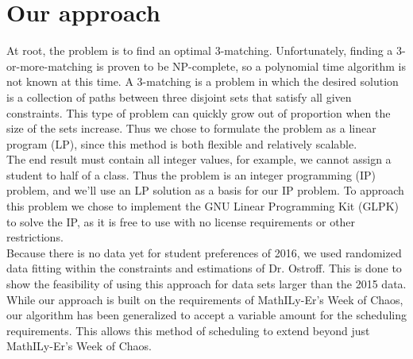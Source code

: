 \documentclass[11pt]{article}
\begin{document}
\section{Our approach}
At root, the problem is to find an optimal 3-matching. Unfortunately, finding a 3-or-more-matching is proven to be NP-complete, so a polynomial time algorithm is not known at this time. A 3-matching is a problem in which the desired solution is a collection of paths between three disjoint sets that satisfy all given constraints. This type of problem can quickly grow out of proportion when the size of the sets increase. Thus we chose to formulate the problem as a linear program (LP), since this method is both flexible and relatively scalable.\\
\indent The end result must contain all integer values, for example, we cannot assign a student to half of a class. Thus the problem is an integer programming (IP) problem, and we'll use an LP solution as a basis for our IP problem. To approach this problem we chose to implement the GNU Linear Programming Kit (GLPK) to solve the IP, as it is free to use with no license requirements or other restrictions.\\
\indent Because there is no data yet for student preferences of 2016, we used randomized data fitting within the constraints and estimations of Dr. Ostroff. This is done to show the feasibility of using this approach for data sets larger than the 2015 data. While our approach is built on the requirements of MathILy-Er's Week of Chaos, our algorithm has been generalized to accept a variable amount for the scheduling requirements. This allows this method of scheduling to extend beyond just MathILy-Er's Week of Chaos.\\
\end{document}
